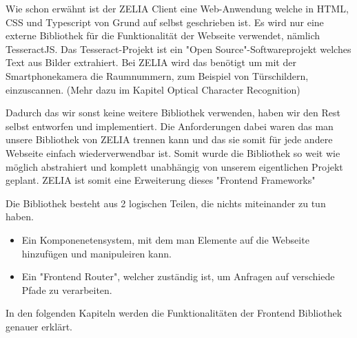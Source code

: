 
Wie schon erwähnt ist der ZELIA Client eine Web-Anwendung welche in HTML, CSS und Typescript von Grund auf selbst geschrieben ist. Es wird nur eine externe Bibliothek für die Funktionalität der Webseite verwendet, nämlich TesseractJS. Das Tesseract-Projekt ist ein "Open Source"-Softwareprojekt welches Text aus Bilder extrahiert. Bei ZELIA wird das benötigt um mit der Smartphonekamera die Raumnummern, zum Beispiel von Türschildern, einzuscannen. (Mehr dazu im Kapitel Optical Character Recognition)

Dadurch das wir sonst keine weitere Bibliothek verwenden, haben wir den Rest selbst entworfen und implementiert. Die Anforderungen dabei waren das man unsere Bibliothek von ZELIA trennen kann und das sie somit für jede andere Webseite einfach wiederverwendbar ist. Somit wurde die Bibliothek so weit wie möglich abstrahiert und komplett unabhängig von unserem eigentlichen Projekt geplant. ZELIA ist somit eine Erweiterung dieses "Frontend Frameworks"

Die Bibliothek besteht aus 2 logischen Teilen, die nichts miteinander zu tun haben. 
\begin{itemize}
    \item Ein Komponenetensystem, mit dem man Elemente auf die Webseite hinzufügen und manipuleiren kann. 
    \item Ein "Frontend Router", welcher zuständig ist, um Anfragen auf verschiede Pfade zu verarbeiten.
\end{itemize}

In den folgenden Kapiteln werden die Funktionalitäten der Frontend Bibliothek genauer erklärt.